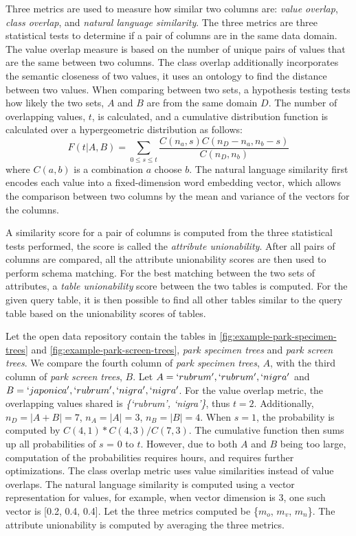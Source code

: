 Three metrics are used to measure how similar two columns are: \textit{value overlap}, \textit{class overlap}, and \textit{natural language similarity}. The three metrics are three statistical tests to determine if a pair of columns are in the same data domain. The value overlap measure is based on the number of unique pairs of values that are the same between two columns. The class overlap additionally incorporates the semantic closeness of two values, it uses an ontology to find the distance between two values. When comparing between two sets, a hypothesis testing tests how likely the two sets, $A$ and $B$ are from the same domain $D$. The number of overlapping values, $t$, is calculated, and a cumulative distribution function is calculated over a hypergeometric distribution as follows:
\[
F(t|A,B) = \sum\limits _{0\le s\le t}\frac{C(n_{a},s)C(n_{D}-n_{a},n_{b}-s)}{C(n_{D},n_{b})}
\]
where $C(a, b)$ is a combination $a$ choose $b$. The natural language similarity first encodes each value into a fixed-dimension word embedding vector, which allows the comparison between two columns by the mean and variance of the vectors for the columns.

A similarity score for a pair of columns is computed from the three statistical tests performed, the score is called the \textit{attribute unionability}. After all pairs of columns are compared, all the attribute unionability scores are then used to perform schema matching. For the best matching between the two sets of attributes, a \textit{table unionability} score between the two tables is computed. For the given query table, it is then possible to find all other tables similar to the query table based on the unionability scores of tables.

Let the open data repository contain the tables in \autoref{fig:example-park-specimen-trees} and \autoref{fig:example-park-screen-trees}, \textit{park specimen trees} and \textit{park screen trees}. We compare the fourth column of \textit{park specimen trees}, $A$, with the third column of \textit{park screen trees}, $B$. Let $A={`rubrum', `rubrum', `nigra'}$ and $B={`japonica', `rubrum', `nigra', `nigra'}$. For the value overlap metric, the overlapping values shared is \textit{\{`rubrum', `nigra'\}}, thus $t=2$. Additionally, $n_D=|A+B|=7$, $n_A=|A|=3$, $n_B=|B|=4$. When $s=1$, the probability is computed by $C(4, 1) * C(4, 3) / C(7, 3)$. The cumulative function then sums up all probabilities of $s$ = 0 to $t$. However, due to both $A$ and $B$ being too large, computation of the probabilities requires hours, and requires further optimizations. The class overlap metric uses value similarities instead of value overlaps. The natural language similarity is computed using a vector representation for values, for example, when vector dimension is 3, one such vector is [0.2, 0.4, 0.4]. Let the three metrics computed be \{$m_o$, $m_v$, $m_n$\}. The attribute unionability is computed by averaging the three metrics.

